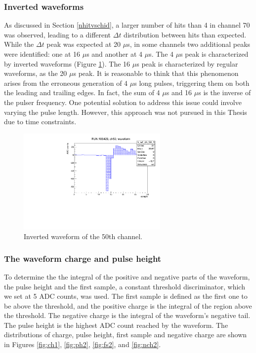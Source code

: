 \subsubsection{Inverted waveforms}\label{inv}
As discussed in Section \ref{nhitvschid}, 
a larger number of hits than 4 
in channel 70 was observed, 
leading to a different $\Delta t$ distribution 
between hits than expected. 
While the $\Delta t$ peak was expected at 
20 $\mu$s, in some channels two 
additional peaks were identified: 
one at 16 $\mu$s and another at 4 $\mu$s. 
The 4 $\mu$s peak is 
characterized by inverted waveforms 
(Figure \ref{fig:inverted}). 
The 16 $\mu$s peak is characterized 
by regular waveforms, as the 20 $\mu$s peak.
It is reasonable to think that this 
phenomenon arises from the erroneous 
generation of 4 $\mu$s long pulses, 
triggering them on both the leading 
and trailing edges. In fact, 
the sum of 4 $\mu$s and 16 $\mu$s 
is the inverse of the pulser frequency. 
One potential solution to address 
this issue could involve varying the pulse length. 
However, this approach was not pursued 
in this Thesis due to time constraints.
\begin{figure}[!h]
  \centering
  \includegraphics[width=0.65\textwidth]{figures/pdf/wf_ch50_1.pdf}
  \caption[An inverted waveform.]{Inverted waveform of the 50th channel.}
 \label{fig:inverted}
\end{figure}
\subsubsection{The waveform charge and pulse height}\label{threshold}
To determine the the integral of the positive and negative 
parts of the waveform, the pulse height and the first 
sample, a constant threshold discriminator, which we 
set at 5 ADC counts, was used. 
The first sample is defined as the first 
one to be above the threshold, 
and the positive charge 
is the integral of the region above the 
threshold. The negative charge 
is the integral of the waveform's 
negative tail. The pulse height is the 
highest ADC count reached 
by the waveform. The distributions of 
charge, pulse height, first sample and negative charge 
are shown in Figures \ref{fig:ch1}, \ref{fig:ph2}, \ref{fig:fs2}, 
and \ref{fig:nch2}.


